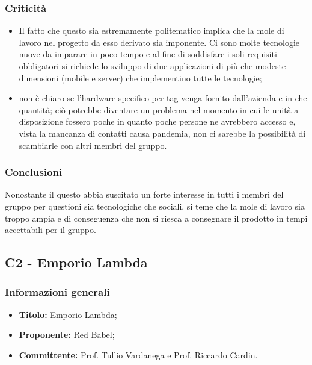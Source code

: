\documentclass[]{article}
\begin{document}
			\subsubsection{Criticità}
			\begin{itemize}
				\item Il fatto che questo  sia estremamente politematico implica che la mole di lavoro nel progetto da esso derivato sia imponente. Ci sono molte tecnologie nuove da imparare in poco tempo e al fine di soddisfare i soli requisiti obbligatori si richiede lo sviluppo di due applicazioni di più che modeste dimensioni (mobile e server) che implementino tutte le tecnologie;
				\item non è chiaro se l'hardware specifico per tag  venga fornito dall'azienda e in che quantità; ciò potrebbe diventare un problema nel momento in cui le unità a disposizione fossero poche in quanto poche persone ne avrebbero accesso e, vista la mancanza di contatti causa pandemia, non ci sarebbe la possibilità di scambiarle con altri membri del gruppo.
			\end{itemize}

			\subsubsection{Conclusioni}
			Nonostante il questo  abbia suscitato un forte interesse in tutti i membri del gruppo per questioni sia tecnologiche che sociali, si teme che la mole di lavoro sia troppo ampia e di conseguenza che non si riesca a consegnare il prodotto in tempi accettabili per il gruppo.

		\newpage

		\subsection{C2 - Emporio Lambda}
		
		\subsubsection{Informazioni generali}
			\begin{itemize}
				\item \textbf{Titolo:} Emporio Lambda;
				\item \textbf{Proponente:} Red Babel;
				\item \textbf{Committente:} Prof. Tullio Vardanega e Prof. Riccardo Cardin.
			\end{itemize}
\end{document}
